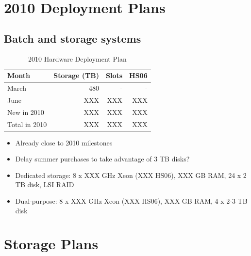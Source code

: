\documentclass{beamer}
\begin{document}
\section{2010 Deployment Plans}
\subsection{Batch and storage systems}
\begin{frame}
\begin{table}
\begin{tabular}{lrrr}
	\toprule
	Month					 	&	 Storage (TB)		&	 Slots	& HS06 \\
	\midrule
	March					 	&	 480						&	 - 			& - \\
	June						&	 XXX						&	 XXX		& XXX \\
	\midrule
	New in 2010			&	 XXX						&	 XXX 		& XXX \\
	Total in 2010		&	 XXX						&	 XXX 		& XXX \\
	\bottomrule
\end{tabular}
\caption{2010 Hardware Deployment Plan}
\label{2010_hardware deployment_plan}
\end{table}

\begin{itemize}
	\item Already close to 2010 milestones
	\item Delay summer purchases to take advantage of 3 TB disks?
	\item Dedicated storage: 8 x XXX GHz Xeon (XXX HS06), XXX GB RAM, 24 x 2 TB disk, LSI RAID
	\item Dual-purpose: 8 x XXX GHz Xeon (XXX HS06), XXX GB RAM, 4 x 2-3 TB disk
\end{itemize}

\end{frame}

\section{Storage Plans}
\end{document}
